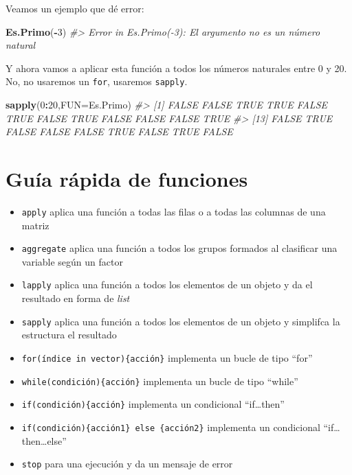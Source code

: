 \documentclass[
]{book}
\newenvironment{Shaded}{\begin{snugshade}}{\end{snugshade}}
\newcommand{\CommentTok}[1]{\textcolor[rgb]{0.56,0.35,0.01}{\textit{#1}}}
\newcommand{\DataTypeTok}[1]{\textcolor[rgb]{0.13,0.29,0.53}{#1}}
\newcommand{\DecValTok}[1]{\textcolor[rgb]{0.00,0.00,0.81}{#1}}
\newcommand{\KeywordTok}[1]{\textcolor[rgb]{0.13,0.29,0.53}{\textbf{#1}}}
\newcommand{\NormalTok}[1]{#1}
\newcommand{\OperatorTok}[1]{\textcolor[rgb]{0.81,0.36,0.00}{\textbf{#1}}}
\theoremstyle{definition}
\theoremstyle{definition}
\theoremstyle{definition}
\theoremstyle{remark}
\begin{document}
Veamos un ejemplo que dé error:

\begin{Shaded}
\begin{Highlighting}[]
\KeywordTok{Es.Primo}\NormalTok{(}\OperatorTok{{-}}\DecValTok{3}\NormalTok{)}
\CommentTok{\#\textgreater{} Error in Es.Primo({-}3): El argumento no es un número natural}
\end{Highlighting}
\end{Shaded}

Y ahora vamos a aplicar esta función a todos los números naturales entre 0 y 20. No, no usaremos un \texttt{for}, usaremos \texttt{sapply}.

\begin{Shaded}
\begin{Highlighting}[]
\KeywordTok{sapply}\NormalTok{(}\DecValTok{0}\OperatorTok{:}\DecValTok{20}\NormalTok{,}\DataTypeTok{FUN=}\NormalTok{Es.Primo)}
\CommentTok{\#\textgreater{}  [1] FALSE FALSE  TRUE  TRUE FALSE  TRUE FALSE  TRUE FALSE FALSE FALSE  TRUE}
\CommentTok{\#\textgreater{} [13] FALSE  TRUE FALSE FALSE FALSE  TRUE FALSE  TRUE FALSE}
\end{Highlighting}
\end{Shaded}

\hypertarget{guuxeda-ruxe1pida-de-funciones-3}{%
\section{Guía rápida de funciones}\label{guuxeda-ruxe1pida-de-funciones-3}}

\begin{itemize}
\item
  \texttt{apply} aplica una función a todas las filas o a todas las columnas de una matriz
\item
  \texttt{aggregate} aplica una función a todos los grupos formados al clasificar una variable según un factor
\item
  \texttt{lapply} aplica una función a todos los elementos de un objeto y da el resultado en forma de \emph{list}
\item
  \texttt{sapply} aplica una función a todos los elementos de un objeto y simplifca la estructura el resultado
\item
  \texttt{for(índice\ in\ vector)\{acción\}} implementa un bucle de tipo ``for''
\item
  \texttt{while(condición)\{acción\}} implementa un bucle de tipo ``while''
\item
  \texttt{if(condición)\{acción\}} implementa un condicional ``if\ldots then''
\item
  \texttt{if(condición)\{acción1\}\ else\ \{acción2\}} implementa un condicional ``if\ldots then\ldots else''
\item
  \texttt{stop} para una ejecución y da un mensaje de error
\end{itemize}
\end{document}
